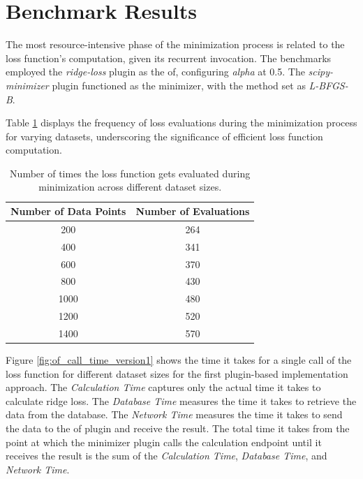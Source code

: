 \documentclass[
  a4paper,  %
  twoside,  %
  bibliography=totoc,
  headsepline,
  cleardoublepage=empty,
  parskip=half,
  draft=false
]{scrbook}
\begin{document}
\section{Benchmark Results}
\label{subsec:benchmarkingResults}

The most resource-intensive phase of the minimization process is related to the loss function's computation, given its recurrent invocation.
The benchmarks employed the \emph{ridge-loss} plugin as the \gls{of}, configuring \emph{alpha} at 0.5.
The \emph{scipy-minimizer} plugin functioned as the minimizer, with the method set as \emph{L-BFGS-B}.

Table \ref{table:of_calls} displays the frequency of loss evaluations during the minimization process for varying datasets, underscoring the significance of efficient loss function computation.

\begin{table}[h!]
  \centering
  \begin{tabular}{cc}
  \toprule
  \textbf{Number of Data Points} & \textbf{Number of Evaluations} \\
  \midrule
  200 & 264 \\
  400 & 341 \\
  600 & 370 \\
  800 & 430 \\
  1000 & 480 \\
  1200 & 520 \\
  1400 & 570 \\
  \bottomrule
  \end{tabular}
  \caption{Number of times the loss function gets evaluated during minimization across different dataset sizes.}
  \label{table:of_calls}
\end{table}

Figure \ref{fig:of_call_time_version1} shows the time it takes for a single call of the loss function for different dataset sizes for the first plugin-based implementation approach.
The \emph{Calculation Time} captures only the actual time it takes to calculate ridge loss.
The \emph{Database Time} measures the time it takes to retrieve the data from the database.
The \emph{Network Time} measures the time it takes to send the data to the \gls{of} plugin and receive the result.
The total time it takes from the point at which the minimizer plugin calls the calculation endpoint until it receives the result is the sum of the \emph{Calculation Time}, \emph{Database Time}, and \emph{Network Time}.
\end{document}
